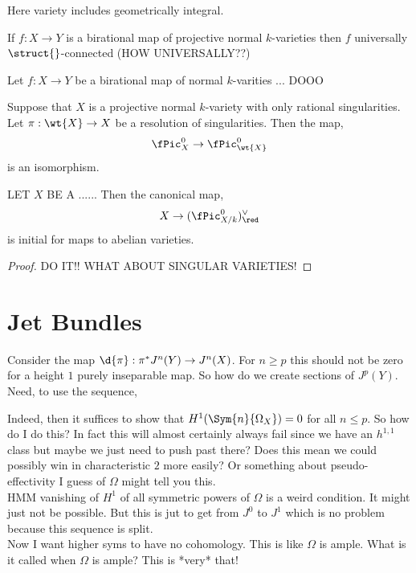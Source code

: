 \documentclass[12pt]{article}
\begin{document}
\begin{rmk}
Here variety includes geometrically integral.
\end{rmk}

\begin{lemma}
If $f : X \to Y$ is a birational map of projective normal $k$-varieties then $f$ universally $\struct{}$-connected (HOW UNIVERSALLY??)
\end{lemma}

\begin{cor}
Let $f : X \to Y$ be a birational map of normal $k$-varities ... DOOO
\end{cor}

\begin{prop}
Suppose that $X$ is a projective normal $k$-variety with only rational singularities. Let $\pi : \wt{X} \to X$ be a resolution of singularities. Then the map,
\[ \fPic_{X}^0 \to \fPic_{\wt{X}}^0 \]
is an isomorphism.
\end{prop}

\begin{prop}
LET $X$ BE A ...... Then the canonical map,
\[ X \to (\fPic_{X/k}^0)_{\red}^\vee \]
is initial for maps to abelian varieties. 
\end{prop}

\begin{proof}
DO IT!! WHAT ABOUT SINGULAR VARIETIES!
\end{proof}

\section{Jet Bundles}


Consider the map $\d{\pi} : \pi^* J^n(Y) \to J^n(X)$. For $n \ge p$ this should not be zero for a height $1$ purely inseparable map. So how do we create sections of $J^p(Y)$. Need, to use the sequence,
\begin{center}
\end{center}
Indeed, then it suffices to show that $H^1(\Sym{n}{\Omega_X}) = 0$ for all $n \le p$. So how do I do this? In fact this will almost certainly always fail since we have an $h^{1,1}$ class but maybe we just need to push past there? Does this mean we could possibly win in characteristic $2$ more easily? Or something about pseudo-effectivity I guess of $\Omega$ might tell you this.
\bigskip\\
HMM vanishing of $H^1$ of all symmetric powers of $\Omega$ is a weird condition. It might just not be possible. But this is jut to get from $J^0$ to $J^1$ which is no problem because this sequence is split.
\bigskip\\
Now I want higher syms to have no cohomology. This is like $\Omega$ is ample. What is it called when $\Omega$ is ample? This is *very* that!
\end{document}
